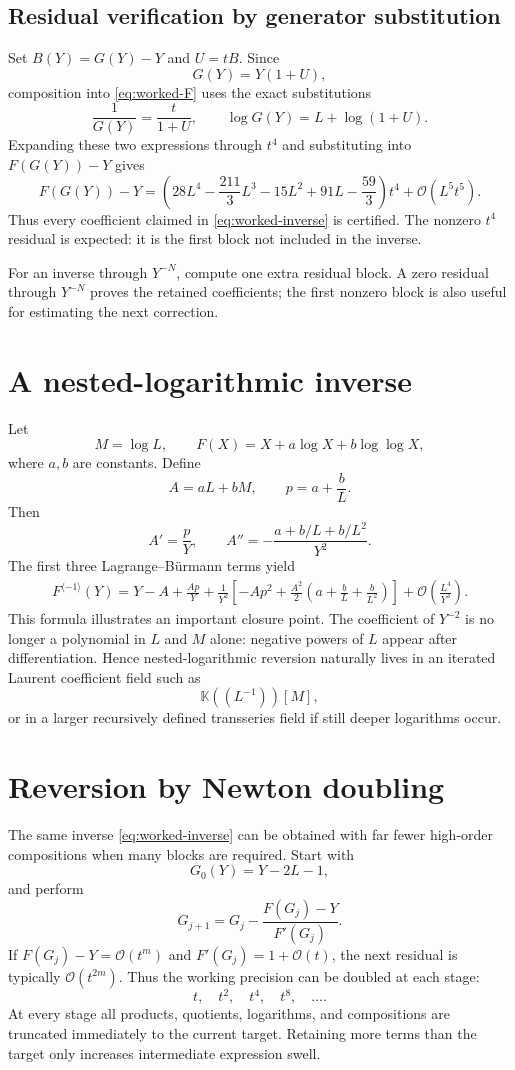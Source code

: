 \documentclass[11pt,oneside]{book}
\theoremstyle{definition}
\theoremstyle{remark}
\newcommand{\K}{\mathbb K}
\newcommand{\bigO}{\mathcal O}
\newcommand{\compinv}{^{\langle-1\rangle}}
\begin{document}
\subsection{Residual verification by generator substitution}
Set $B(Y)=G(Y)-Y$ and $U=tB$. Since
\[
 G(Y)=Y(1+U),
\]
composition into \eqref{eq:worked-F} uses the exact substitutions
\[
 \frac1{G(Y)}=\frac{t}{1+U},
 \qquad
 \log G(Y)=L+\log(1+U).
\]
Expanding these two expressions through $t^4$ and substituting into
$F(G(Y))-Y$ gives
\[
 F(G(Y))-Y
 =\left(28L^4-\frac{211}{3}L^3-15L^2+91L-\frac{59}{3}\right)t^4
 +\bigO(L^5t^5).
\]
Thus every coefficient claimed in \eqref{eq:worked-inverse} is certified.
The nonzero $t^4$ residual is expected: it is the first block not included in
the inverse.

\begin{computebox}
For an inverse through $Y^{-N}$, compute one extra residual block. A zero
residual through $Y^{-N}$ proves the retained coefficients; the first
nonzero block is also useful for estimating the next correction.
\end{computebox}

\section{A nested-logarithmic inverse}
Let
\[
 M=\log L,\qquad
 F(X)=X+a\log X+b\log\log X,
\]
where $a,b$ are constants. Define
\[
 A=aL+bM,\qquad p=a+\frac bL.
\]
Then
\[
 A'=\frac{p}{Y},\qquad
 A''=-\frac{a+b/L+b/L^2}{Y^2}.
\]
The first three Lagrange--B\"urmann terms yield
\begin{align}
 F\compinv(Y)
 =Y-A+\frac{Ap}{Y}
 +\frac{1}{Y^2}\left[
   -Ap^2+\frac{A^2}{2}
   \left(a+\frac bL+\frac b{L^2}\right)\right]
 +\bigO\!\left(\frac{L^4}{Y^3}\right).
 \label{eq:nested-log-inverse}
\end{align}
This formula illustrates an important closure point. The coefficient of
$Y^{-2}$ is no longer a polynomial in $L$ and $M$ alone: negative powers of
$L$ appear after differentiation. Hence nested-logarithmic reversion
naturally lives in an iterated Laurent coefficient field such as
\[
 \K((L^{-1}))[M],
\]
or in a larger recursively defined transseries field if still deeper
logarithms occur.

\section{Reversion by Newton doubling}
The same inverse \eqref{eq:worked-inverse} can be obtained with far fewer
high-order compositions when many blocks are required. Start with
\[
 G_0(Y)=Y-2L-1,
\]
and perform
\begin{equation}\label{eq:worked-newton}
 G_{j+1}
 =G_j-\frac{F(G_j)-Y}{F'(G_j)}.
\end{equation}
If $F(G_j)-Y=\bigO(t^m)$ and $F'(G_j)=1+\bigO(t)$, the next residual is
typically $\bigO(t^{2m})$. Thus the working precision can be doubled at
each stage:
\[
 t,\quad t^2,\quad t^4,\quad t^8,\quad\ldots.
\]
At every stage all products, quotients, logarithms, and compositions are
truncated immediately to the current target. Retaining more terms than the
target only increases intermediate expression swell.
\end{document}
